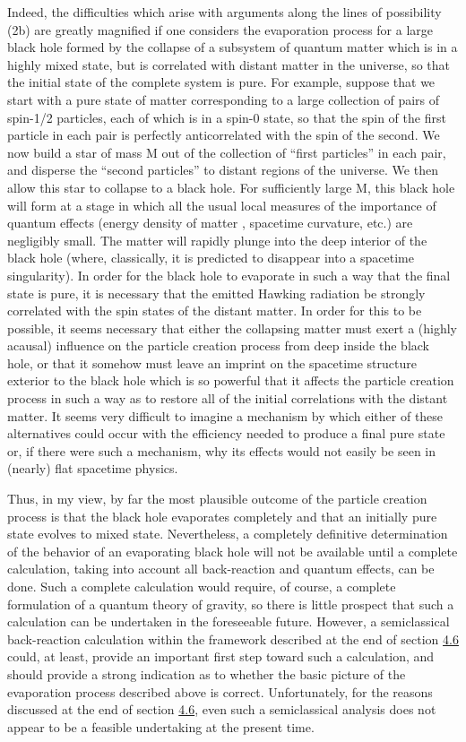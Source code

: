 \documentclass[11pt,a4paper]{article}
\begin{document}
Indeed, the difficulties which arise with arguments along the lines of possibility (2b) are greatly magnified if one considers the evaporation process for a large black hole formed by the collapse of a subsystem of quantum matter which is in a highly mixed state, but is correlated with distant matter in the universe, so that the initial state of the complete system is pure. For example, suppose that we start with a pure state of matter corresponding to a large collection of pairs of spin-1/2 particles, each of which is in a spin-0 state, so that the spin of the first particle in each pair is perfectly anticorrelated with the spin of the second. We now build a star of mass M out of the collection of ``first particles'' in each pair, and disperse the ``second particles'' to distant regions of the universe. We then allow this star to collapse to a black hole. For sufficiently large M, this black hole will form at a stage in which all the usual local measures of the importance of quantum effects (energy density of matter\hypertarget{source-198}{} , spacetime curvature, etc.) are negligibly small. The matter will rapidly plunge into the deep interior of the black hole (where, classically, it is predicted to disappear into a spacetime singularity). In order for the black hole to evaporate in such a way that the final state is pure, it is necessary that the emitted Hawking radiation be strongly correlated with the spin states of the distant matter. In order for this to be possible, it seems necessary that either the collapsing matter must exert a (highly acausal) influence on the particle creation process from deep inside the black hole, or that it somehow must leave an imprint on the spacetime structure exterior to the black hole which is so powerful that it affects the particle creation process in such a way as to restore all of the initial correlations with the distant matter. It seems very difficult to imagine a mechanism by which either of these alternatives could occur with the efficiency needed to produce a final pure state or, if there were such a mechanism, why its effects would not easily be seen in (nearly) flat spacetime physics.

Thus, in my view, by far the most plausible outcome of the particle creation process is that the black hole evaporates completely and that an initially pure state evolves to mixed state. Nevertheless, a completely definitive determination of the behavior of an evaporating black hole will not be available until a complete calculation, taking into account all back-reaction and quantum effects, can be done. Such a complete calculation would require, of course, a complete formulation of a quantum theory of gravity, so there is little prospect that such a calculation can be undertaken in the foreseeable future. However, a semiclassical back-reaction calculation within the framework described at the end of section \hyperlink{sec:4.6}{4.6} could, at least, provide an important first step toward such a calculation, and should provide a strong indication as to whether the basic picture of the evaporation process described above is correct. Unfortunately, for the reasons discussed at the end of section \hyperlink{sec:4.6}{4.6}, even such a semiclassical analysis does not appear to be a feasible undertaking at the present time.
\end{document}
